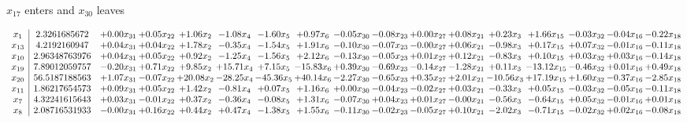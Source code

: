 \documentclass[9pt]{article}
\begin{document}
 $ x_{17} $ enters and $ x_{30} $ leaves 

 \[\begin{array}{c| c c@{\hskip 2pt} c@{\hskip 2pt} c@{\hskip 2pt} c@{\hskip 2pt} c@{\hskip 2pt} c@{\hskip 2pt} c@{\hskip 2pt} c@{\hskip 2pt} c@{\hskip 2pt} c@{\hskip 2pt} c@{\hskip 2pt} c@{\hskip 2pt} c@{\hskip 2pt} c@{\hskip 2pt} c@{\hskip 2pt} }
 x_{1}   &  2.3261685672 & +  0.00 x_{31} & +  0.05 x_{22} & +  1.06 x_{2} & -1.08 x_{4} & -1.60 x_{5} & +  0.97 x_{6} & -0.05 x_{30} & -0.08 x_{23} & +  0.00 x_{27} & +  0.08 x_{21} & +  0.23 x_{3} & +  1.66 x_{15} & -0.03 x_{32} & -0.04 x_{16} & -0.22 x_{18}\\
 x_{13}   &  4.2192160947 & +  0.04 x_{31} & +  0.04 x_{22} & +  1.78 x_{2} & -0.35 x_{4} & -1.54 x_{5} & +  1.91 x_{6} & -0.10 x_{30} & -0.07 x_{23} & -0.00 x_{27} & +  0.06 x_{21} & -0.98 x_{3} & +  0.17 x_{15} & +  0.07 x_{32} & -0.01 x_{16} & -0.11 x_{18}\\
 x_{10}   &  2.96348763976 & +  0.04 x_{31} & +  0.05 x_{22} & +  0.92 x_{2} & -1.25 x_{4} & -1.56 x_{5} & +  2.12 x_{6} & -0.13 x_{30} & -0.05 x_{23} & +  0.01 x_{27} & +  0.12 x_{21} & -0.83 x_{3} & +  0.10 x_{15} & +  0.03 x_{32} & +  0.03 x_{16} & -0.14 x_{18}\\
 x_{19}   &  7.89012059757 & -0.20 x_{31} & +  0.71 x_{22} & +  9.85 x_{2} & + 15.71 x_{4} & +  7.15 x_{5} & -15.83 x_{6} & +  0.39 x_{30} & -0.69 x_{23} & -0.14 x_{27} & -1.28 x_{21} & +  0.11 x_{3} & -13.12 x_{15} & -0.46 x_{32} & +  0.01 x_{16} & +  0.49 x_{18}\\
 x_{20}   &  56.5187188563 & +  1.07 x_{31} & -0.07 x_{22} & + 20.08 x_{2} & -28.25 x_{4} & -45.36 x_{5} & + 40.14 x_{6} & -2.27 x_{30} & -0.65 x_{23} & +  0.35 x_{27} & +  2.01 x_{21} & -10.56 x_{3} & + 17.19 x_{15} & +  1.60 x_{32} & -0.37 x_{16} & -2.85 x_{18}\\
 x_{11}   &  1.86217654573 & +  0.09 x_{31} & +  0.05 x_{22} & +  1.42 x_{2} & -0.81 x_{4} & +  0.07 x_{5} & +  1.16 x_{6} & +  0.00 x_{30} & -0.04 x_{23} & -0.02 x_{27} & +  0.03 x_{21} & -0.33 x_{3} & +  0.05 x_{15} & -0.03 x_{32} & -0.05 x_{16} & -0.11 x_{18}\\
 x_{7}   &  4.32241615643 & +  0.03 x_{31} & -0.01 x_{22} & +  0.37 x_{2} & -0.36 x_{4} & -0.08 x_{5} & +  1.31 x_{6} & -0.07 x_{30} & +  0.04 x_{23} & +  0.01 x_{27} & -0.00 x_{21} & -0.56 x_{3} & -0.64 x_{15} & +  0.05 x_{32} & -0.01 x_{16} & +  0.01 x_{18}\\
 x_{8}   &  2.08716531933 & -0.00 x_{31} & +  0.16 x_{22} & +  0.44 x_{2} & +  0.47 x_{4} & -1.38 x_{5} & +  1.55 x_{6} & -0.11 x_{30} & -0.02 x_{23} & -0.05 x_{27} & +  0.10 x_{21} & -2.02 x_{3} & -0.71 x_{15} & -0.02 x_{32} & +  0.02 x_{16} & -0.08 x_{18}\\

\end{array}\]
\end{document}
